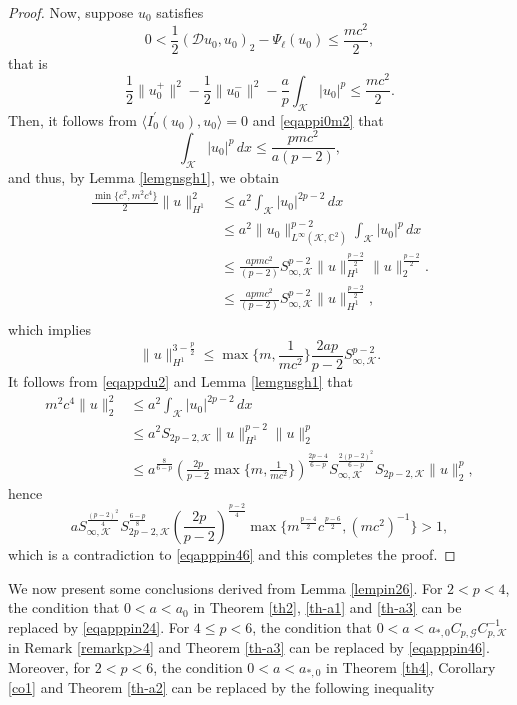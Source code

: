 \documentclass[11pt]{amsart}
\newcommand{\abs}[1]{\lvert#1\rvert}
\newcommand{\norm}[1]{\lVert#1\rVert}
\newcommand{\D}{\mathcal{D}}
\newcommand{\G}{\mathcal{G}}
\newcommand{\K}{\mathcal{K}}
\numberwithin{equation}{section}
\begin{document}
\begin{proof}
Now, suppose  $u_0$ satisfies
$$
0<\frac{1}{2}(\D u_{0}, u_{0})_{2}-\Psi_\ell(u_{0})\leq \frac{mc^2}{2},
$$
that is
\begin{equation}\label{eqappi0m2}
        \frac{1}{2}\norm{u^+_{0}}^2 - \frac{1}{2}\norm{u^-_{0}}^2 - \frac{a}{p}\int_{\K}\abs{u_{0}}^p \leq \frac{mc^2}{2}.
\end{equation}
Then, it follows from $\langle I_{{0}}^{\prime}(u_{0}), u_{0}\rangle = 0$ and \eqref{eqappi0m2} that
\begin{equation*}
    \int_{\K}\abs{u_{{0}}}^p\, dx   \leq \frac{pmc^2}{a(p-2)},
\end{equation*}
and thus, by Lemma \eqref{lemgnsgh1}, we obtain
\[\begin{aligned}
    \frac{\min\{c^2,m^2c^4\}}{2}\norm{u}_{H^1}^2&\leq a^2 \int_{\K}\abs{u_{{0}}}^{2p-2}\, dx \\
    &\leq a^2\norm{u_0}_{L^\infty(\K, \mathbb{C}^2)}^{p-2}\int_{\K}\abs{u_{{0}}}^{p}\, dx\\
    &\leq\frac{apmc^2}{(p-2)}S_{\infty,\K}^{p-2} \norm{u}_{H^1}^\frac{p-2}{2}\norm{u}_2^\frac{p-2}{2}.\\
    &\leq\frac{apmc^2}{(p-2)}S_{\infty,\K}^{p-2} \norm{u}_{H^1}^\frac{p-2}{2},\\
\end{aligned}
\]
which implies
\[
\norm{u}_{H^1}^{3-\frac{p}{2}}\leq \max\{ m,\frac{1}{mc^2}\}\frac{2ap}{p-2}S_{\infty,\K}^{p-2}.
\]
It follows from \eqref{eqappdu2} and Lemma \eqref{lemgnsgh1} that
\[\begin{aligned}
m^2c^4\norm{u}_2^2&\leq a^2 \int_{\K}\abs{u_{{0}}}^{2p-2}\, dx\\
&\leq a^2S_{2p-2,\K}\norm{u}_{H^1}^{p-2}\norm{u}_2^p\\
&\leq a^\frac{8}{6-p}\left(\frac{2p}{p-2}\max\{ m,\frac{1}{mc^2}\}\right)^\frac{2p-4}{6-p}S_{\infty,\K}^\frac{2(p-2)^2}{6-p}S_{2p-2,\K}\norm{u}_2^p,
\end{aligned}
\]
hence
\[
 a S_{\infty,\K}^\frac{(p-2)^2}{4}S_{2p-2,\K}^\frac{6-p}{8}\left(\frac{2p}{p-2}\right)^\frac{p-2}{4} \max\{m^\frac{p-4}{2}c^{\frac{p-6}{2}},(mc^2)^{-1}\}> 1,
\]
 which is a contradiction to \eqref{eqapppin46} and this completes the proof.
\end{proof}
    We now present some conclusions derived from Lemma \ref{lempin26}. For $2<p<4$,  the condition that $0<a<a_{0}$ in Theorem \ref{th2}, \ref{th-a1} and \ref{th-a3} can be replaced by \eqref{eqapppin24}. For $4\leq p<6$, the condition that $0<a<a_{*,0}C_{p,\G}C_{p,\K}^{-1}$ in Remark \ref{remarkp>4} and Theorem \ref{th-a3} can be replaced by \eqref{eqapppin46}. Moreover, for $2<p<6$, the condition $0<a<a_{*,0}$ in Theorem \ref{th4}, Corollary \ref{co1} and Theorem \ref{th-a2} can be replaced by the following inequality
\end{document}
